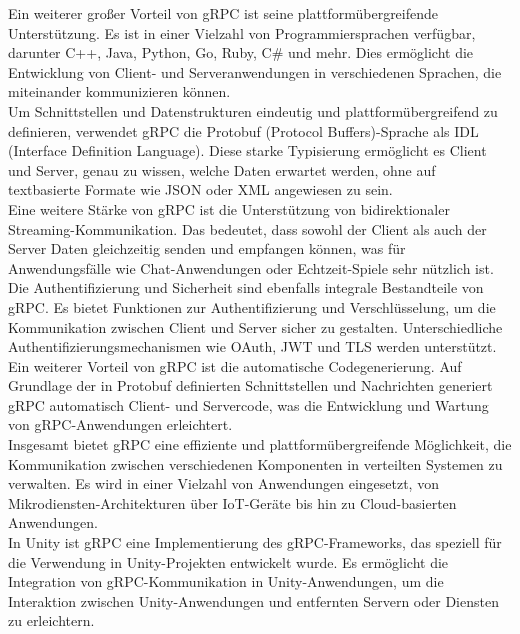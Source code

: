Ein weiterer großer Vorteil von gRPC ist seine plattformübergreifende Unterstützung. Es ist in einer Vielzahl von Programmiersprachen verfügbar, darunter C++, Java, Python, Go, Ruby, C\# und mehr. Dies ermöglicht die Entwicklung von Client- und Serveranwendungen in verschiedenen Sprachen, die miteinander kommunizieren können.\\

Um Schnittstellen und Datenstrukturen eindeutig und plattformübergreifend zu definieren, verwendet gRPC die Protobuf (Protocol Buffers)-Sprache als IDL (Interface Definition Language). Diese starke Typisierung ermöglicht es Client und Server, genau zu wissen, welche Daten erwartet werden, ohne auf textbasierte Formate wie JSON oder XML angewiesen zu sein.\\

Eine weitere Stärke von gRPC ist die Unterstützung von bidirektionaler Streaming-Kommunikation. Das bedeutet, dass sowohl der Client als auch der Server Daten gleichzeitig senden und empfangen können, was für Anwendungsfälle wie Chat-Anwendungen oder Echtzeit-Spiele sehr nützlich ist.\\

Die Authentifizierung und Sicherheit sind ebenfalls integrale Bestandteile von gRPC. Es bietet Funktionen zur Authentifizierung und Verschlüsselung, um die Kommunikation zwischen Client und Server sicher zu gestalten. Unterschiedliche Authentifizierungsmechanismen wie OAuth, JWT und TLS werden unterstützt.\\

Ein weiterer Vorteil von gRPC ist die automatische Codegenerierung. Auf Grundlage der in Protobuf definierten Schnittstellen und Nachrichten generiert gRPC automatisch Client- und Servercode, was die Entwicklung und Wartung von gRPC-Anwendungen erleichtert.\\

Insgesamt bietet gRPC eine effiziente und plattformübergreifende Möglichkeit, die Kommunikation zwischen verschiedenen Komponenten in verteilten Systemen zu verwalten. Es wird in einer Vielzahl von Anwendungen eingesetzt, von Mikrodiensten-Architekturen über IoT-Geräte bis hin zu Cloud-basierten Anwendungen.\\


In Unity ist gRPC eine Implementierung des gRPC-Frameworks, das speziell für die Verwendung in Unity-Projekten entwickelt wurde. Es ermöglicht die Integration von gRPC-Kommunikation in Unity-Anwendungen, um die Interaktion zwischen Unity-Anwendungen und entfernten Servern oder Diensten zu erleichtern.\\


